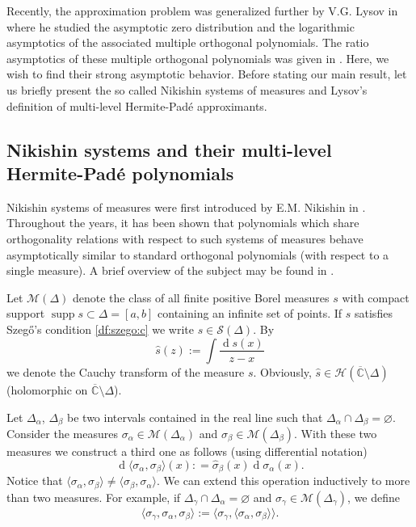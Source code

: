 \documentclass{amsart}
\numberwithin{equation}{section}
\theoremstyle{definition}
\DeclareMathOperator{\D}{d}        %
\DeclareMathOperator{\supp}{supp}  %
\newcommand{\CC}{\mathbb{C}}      %
\begin{document}
    Recently, the approximation problem was generalized further by V.G. Lysov in \cite{lysov20} where he studied the asymptotic zero distribution and the logarithmic asymptotics of the associated multiple orthogonal polynomials. The ratio asymptotics of these multiple orthogonal polynomials was given in \cite{SLL22}. Here, we wish to find their strong asymptotic behavior. Before stating our main result, let us briefly present the so called Nikishin systems of measures and Lysov’s definition of multi-level Hermite-Pad\'e approximants.

\subsection{Nikishin systems and their multi-level Hermite-Pad\'e polynomials}

    Nikishin systems of measures were first introduced by E.M. Nikishin in \cite{nikishin82}. Throughout the years, it has been shown that polynomials which share orthogonality
    relations with respect to such systems of measures behave asymptotically similar  to
    standard orthogonal polynomials (with respect to a single measure). A brief overview of the subject may be found in \cite{lago21}.

    Let $\mathcal{M}(\Delta)$ denote the class of all finite positive Borel measures $s$ with compact support $\supp s \subset \Delta=[a,b]$ containing an infinite set of points. If $s$  satisfies Szeg\H{o}'s condition \eqref{df:szego:c} we write $s \in \mathcal{S}(\Delta)$. By
    \[
        \widehat{s}(z) := \int\frac{\D s(x)}{z-x}
    \]
    we denote the Cauchy transform of the measure $s$. Obviously, $\widehat{s} \in\mathcal{H}(\overline{\CC}\setminus\Delta)$ (holomorphic on $\overline{\CC}\setminus\Delta$).

	Let $\Delta_\alpha$, $\Delta_\beta$ be two intervals contained in the real line such that $\Delta_\alpha\cap\Delta_\beta=\varnothing$. Consider the measures $\sigma_\alpha\in\mathcal{M}(\Delta_\alpha)$ and $\sigma_\beta\in\mathcal{M}(\Delta_\beta)$. With these two measures we construct a third one as follows (using differential notation)
	$$\D\langle \sigma_\alpha,\sigma_\beta\rangle(x): = \widehat{\sigma}_\beta(x)\D\sigma_\alpha(x).$$
Notice that $\langle \sigma_\alpha,\sigma_\beta\rangle \neq \langle \sigma_\beta,\sigma_\alpha \rangle$.  We can extend this operation inductively to more than two measures. For example, if   $\Delta_\gamma \cap\Delta_\alpha = \varnothing$ and
$\sigma_\gamma \in \mathcal{M}(\Delta_\gamma)$, we define
\[ \langle \sigma_\gamma,\sigma_\alpha,\sigma_\beta \rangle :=  \langle \sigma_\gamma, \langle \sigma_\alpha,\sigma_\beta \rangle \rangle.
\]
	
\end{document}

